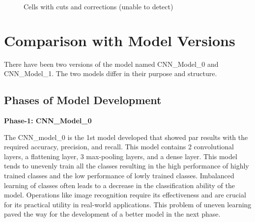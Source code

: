\begin{figure}[h!]
    \vspace{5pt}
    
    \hspace{10pt}
    \caption{Cells with cuts and corrections (unable to detect)}
\end{figure}

\clearpage

\section{Comparison with Model Versions}

There have been two versions of the model named CNN\_Model\_0 and CNN\_Model\_1. The two models differ in their purpose and structure.

\subsection{Phases of Model Development}

\textbf{Phase-1: CNN\_Model\_0}

\noindent The CNN\_model\_0 is the 1st model developed that showed par results with the required accuracy, precision, and recall. This model contains 2 convolutional layers, a flattening layer, 3 max-pooling layers, and a dense layer. This model tends to unevenly train all the classes resulting in the high performance of highly trained classes and the low performance of lowly trained classes. Imbalanced learning of classes often leads to a decrease in the classification ability of the model. Operations like image recognition require its effectiveness and are crucial for its practical utility in real-world applications. This problem of uneven learning paved the way for the development of a better model in the next phase.\\

